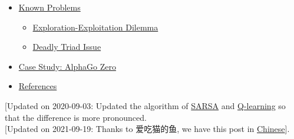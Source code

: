 \begin{itemize}
\begin{itemize}
    \begin{itemize}
    \tightlist
    \item
      \hyperref[bootstrapping]{Bootstrapping}
    \item
      \hyperref[value-estimation]{Value Estimation}
    \item
      \hyperref[sarsa-on-policy-td-control]{SARSA: On-Policy TD control}
    \item
      \hyperref[q-learning-off-policy-td-control]{Q-Learning: Off-policy TD control}
    \item
      \hyperref[deep-q-network]{Deep Q-Network}
    \end{itemize}
  \item
    \hyperref[combining-td-and-mc-learning]{Combining TD and MC Learning}
  \item
    \hyperref[policy-gradient]{Policy Gradient}

    \begin{itemize}
    \tightlist
    \item
      \hyperref[policy-gradient-theorem]{Policy Gradient Theorem}
    \item
      \hyperref[reinforce]{REINFORCE}
    \item
      \hyperref[actor-critic]{Actor-Critic}
    \item
      \hyperref[a3c]{A3C}
    \end{itemize}
  \item
    \hyperref[evolution-strategies]{Evolution Strategies}
  \end{itemize}
\item
  \hyperref[known-problems]{Known Problems}

  \begin{itemize}
  \tightlist
  \item
    \hyperref[exploration-exploitation-dilemma]{Exploration-Exploitation Dilemma}
  \item
    \hyperref[deadly-triad-issue]{Deadly Triad Issue}
  \end{itemize}
\item
  \hyperref[case-study-alphago-zero]{Case Study: AlphaGo Zero}
\item
  \hyperref[references]{References}
\end{itemize}

{{[}Updated on 2020-09-03: Updated the algorithm of \hyperref[sarsa-on-policy-td-control]{SARSA} and \hyperref[q-learning-off-policy-td-control]{Q-learning} so that the difference is more pronounced.}\\
{{[}Updated on 2021-09-19: Thanks to 爱吃猫的鱼, we have this post in \href{https://paperexplained.cn/articles/article/detail/33/}{Chinese}{]}.}

